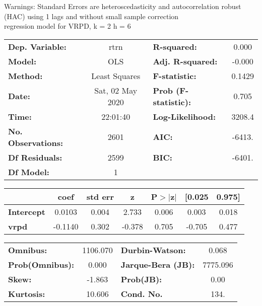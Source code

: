 Warnings: \newline
 [1] Standard Errors are heteroscedasticity and autocorrelation robust (HAC) using 1 lags and without small sample correction\\ 

regression model for VRPD, k = 2 h = 6\begin{center}
\begin{tabular}{lclc}
\toprule
\textbf{Dep. Variable:}    &       rtrn       & \textbf{  R-squared:         } &     0.000   \\
\textbf{Model:}            &       OLS        & \textbf{  Adj. R-squared:    } &    -0.000   \\
\textbf{Method:}           &  Least Squares   & \textbf{  F-statistic:       } &    0.1429   \\
\textbf{Date:}             & Sat, 02 May 2020 & \textbf{  Prob (F-statistic):} &    0.705    \\
\textbf{Time:}             &     22:01:40     & \textbf{  Log-Likelihood:    } &    3208.4   \\
\textbf{No. Observations:} &        2601      & \textbf{  AIC:               } &    -6413.   \\
\textbf{Df Residuals:}     &        2599      & \textbf{  BIC:               } &    -6401.   \\
\textbf{Df Model:}         &           1      & \textbf{                     } &             \\
\bottomrule
\end{tabular}
\begin{tabular}{lcccccc}
                   & \textbf{coef} & \textbf{std err} & \textbf{z} & \textbf{P$> |$z$|$} & \textbf{[0.025} & \textbf{0.975]}  \\
\midrule
\textbf{Intercept} &       0.0103  &        0.004     &     2.733  &         0.006        &        0.003    &        0.018     \\
\textbf{vrpd}      &      -0.1140  &        0.302     &    -0.378  &         0.705        &       -0.705    &        0.477     \\
\bottomrule
\end{tabular}
\begin{tabular}{lclc}
\textbf{Omnibus:}       & 1106.070 & \textbf{  Durbin-Watson:     } &    0.068  \\
\textbf{Prob(Omnibus):} &   0.000  & \textbf{  Jarque-Bera (JB):  } & 7775.096  \\
\textbf{Skew:}          &  -1.863  & \textbf{  Prob(JB):          } &     0.00  \\
\textbf{Kurtosis:}      &  10.606  & \textbf{  Cond. No.          } &     134.  \\
\bottomrule
\end{tabular}
\end{center}

